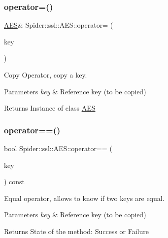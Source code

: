 \subsubsection{\texorpdfstring{operator=()}{operator=()}}
{\footnotesize\ttfamily \hyperlink{class_spider_1_1ssl_1_1_a_e_s}{A\+ES}\& Spider\+::ssl\+::\+A\+E\+S\+::operator= (\begin{DoxyParamCaption}\item[{const \hyperlink{class_spider_1_1ssl_1_1_a_e_s}{A\+ES} \&}]{key }\end{DoxyParamCaption})}



Copy Operator, copy a key. 


\begin{DoxyParams}{Parameters}
{\em key} & Reference key (to be copied) \\
\hline
\end{DoxyParams}
\begin{DoxyReturn}{Returns}
Instance of class \hyperlink{class_spider_1_1ssl_1_1_a_e_s}{A\+ES} 
\end{DoxyReturn}
\mbox{\label{class_spider_1_1ssl_1_1_a_e_s_ad9014e425e6149e7006b8b309a933bc2}} 
\subsubsection{\texorpdfstring{operator==()}{operator==()}}
{\footnotesize\ttfamily bool Spider\+::ssl\+::\+A\+E\+S\+::operator== (\begin{DoxyParamCaption}\item[{const \hyperlink{class_spider_1_1ssl_1_1_a_e_s}{A\+ES} \&}]{key }\end{DoxyParamCaption}) const\hspace{0.3cm}{\ttfamily [inline]}}



Equal operator, allows to know if two keys are equal. 


\begin{DoxyParams}{Parameters}
{\em key} & Reference key (to be copied) \\
\hline
\end{DoxyParams}
\begin{DoxyReturn}{Returns}
State of the method\+: Success or Failure 
\end{DoxyReturn}
\mbox{\label{class_spider_1_1ssl_1_1_a_e_s_a9ed853ba70dba93ed28523a9dcd52d72}} 
